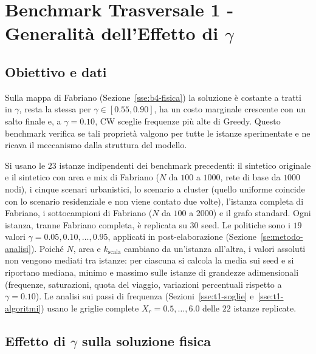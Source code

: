 \section{Benchmark Trasversale 1 - Generalità dell'Effetto di \texorpdfstring{$\gamma$}{gamma}}\label{se:t1}

\subsection{Obiettivo e dati}\label{sse:t1-dati}

Sulla mappa di Fabriano (Sezione~\ref{sse:b4-fisica}) la soluzione è costante a tratti in $\gamma$, resta la stessa per $\gamma\in[0.55,0.90]$, ha un costo marginale crescente con un salto finale e, a $\gamma=0.10$, CW sceglie frequenze più alte di Greedy. Questo benchmark verifica se tali proprietà valgono per tutte le istanze sperimentate e ne ricava il meccanismo dalla struttura del modello.

Si usano le $23$ istanze indipendenti dei benchmark precedenti: il sintetico originale e il sintetico con area e mix di Fabriano ($N$ da $100$ a $1000$, rete di base da $1000$ nodi), i cinque scenari urbanistici, lo scenario a cluster (quello uniforme coincide con lo scenario residenziale e non viene contato due volte), l'istanza completa di Fabriano, i sottocampioni di Fabriano ($N$ da $100$ a $2000$) e il grafo standard. Ogni istanza, tranne Fabriano completa, è replicata su $30$ seed. Le politiche sono i $19$ valori $\gamma=0.05,0.10,\dots,0.95$, applicati in post-elaborazione (Sezione~\ref{se:metodo-analisi}). Poiché $N$, area e $k_{\mathrm{scala}}$ cambiano da un'istanza all'altra, i valori assoluti non vengono mediati tra istanze: per ciascuna si calcola la media sui seed e si riportano mediana, minimo e massimo sulle istanze di grandezze adimensionali (frequenze, saturazioni, quota del viaggio, variazioni percentuali rispetto a $\gamma=0.10$). Le analisi sui passi di frequenza (Sezioni~\ref{sse:t1-soglie} e~\ref{sse:t1-algoritmi}) usano le griglie complete $X_r=0.5,\dots,6.0$ delle $22$ istanze replicate.

\newpage
\subsection{Effetto di \texorpdfstring{$\gamma$}{gamma} sulla soluzione fisica}\label{sse:t1-fisica}

